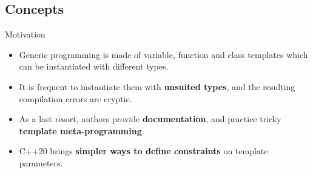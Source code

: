 \subsection[concepts]{Concepts}

\usepackage{minted}

\begin{frame}[fragile]
  \begin{block}{Motivation}
    \begin{itemize}
    \item Generic programming is made of variable, function and class templates which can be instantiated with different types.
    \item It is frequent to instantiate them with \textbf{unsuited types}, and the resulting compilation errors are cryptic.
    \item As a last resort, authors provide \textbf{documentation}, and practice tricky \textbf{template meta-programming}.
    \item C++20 brings \textbf{simpler ways to define constraints} on template parameters.
    \end{itemize}
  \end{block}
\end{frame}

